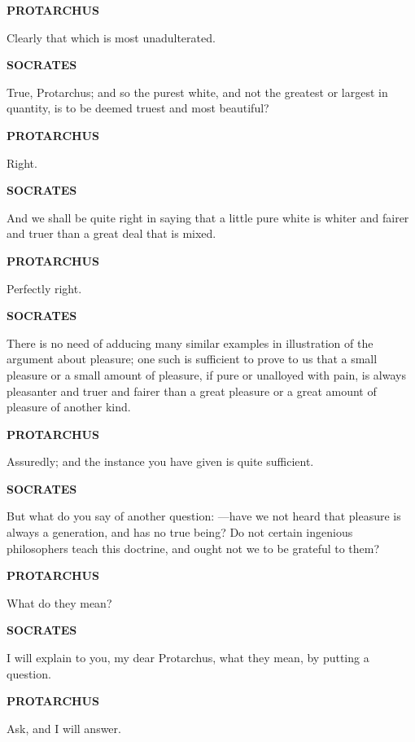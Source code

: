 \documentclass[11pt,letter]{article}
\begin{document}
\par \textbf{PROTARCHUS}
\par   Clearly that which is most unadulterated.

\par \textbf{SOCRATES}
\par   True, Protarchus; and so the purest white, and not the greatest or largest in quantity, is to be deemed truest and most beautiful?

\par \textbf{PROTARCHUS}
\par   Right.

\par \textbf{SOCRATES}
\par   And we shall be quite right in saying that a little pure white is whiter and fairer and truer than a great deal that is mixed.

\par \textbf{PROTARCHUS}
\par   Perfectly right.

\par \textbf{SOCRATES}
\par   There is no need of adducing many similar examples in illustration of the argument about pleasure; one such is sufficient to prove to us that a small pleasure or a small amount of pleasure, if pure or unalloyed with pain, is always pleasanter and truer and fairer than a great pleasure or a great amount of pleasure of another kind.

\par \textbf{PROTARCHUS}
\par   Assuredly; and the instance you have given is quite sufficient.

\par \textbf{SOCRATES}
\par   But what do you say of another question: —have we not heard that pleasure is always a generation, and has no true being? Do not certain ingenious philosophers teach this doctrine, and ought not we to be grateful to them?

\par \textbf{PROTARCHUS}
\par   What do they mean?

\par \textbf{SOCRATES}
\par   I will explain to you, my dear Protarchus, what they mean, by putting a question.

\par \textbf{PROTARCHUS}
\par   Ask, and I will answer.
\end{document}
